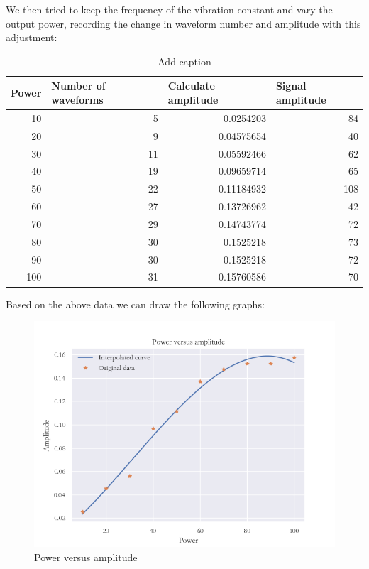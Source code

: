 \documentclass[UTF8]{article}
\begin{document}
    We then tried to keep the frequency of the vibration constant and vary the output power, recording the change in waveform number and amplitude with this adjustment:
    \begin{table}[htbp]
      \centering
      \caption{Add caption}
        \begin{tabular}{rrrr}
        \toprule[2pt]
        \multicolumn{1}{l}{Power} & \multicolumn{1}{l}{Number of waveforms} & \multicolumn{1}{l}{Calculate amplitude} & \multicolumn{1}{l}{Signal amplitude} \\
        \midrule
        10    & 5     & 0.0254203 & 84 \\
        20    & 9     & 0.04575654 & 40 \\
        30    & 11    & 0.05592466 & 62 \\
        40    & 19    & 0.09659714 & 65 \\
        50    & 22    & 0.11184932 & 108 \\
        60    & 27    & 0.13726962 & 42 \\
        70    & 29    & 0.14743774 & 72 \\
        80    & 30    & 0.1525218 & 73 \\
        90    & 30    & 0.1525218 & 72 \\
        100   & 31    & 0.15760586 & 70 \\
        \bottomrule[2pt]
        \end{tabular}%
      \label{tab:addlabel}%
    \end{table}%
    
    Based on the above data we can draw the following graphs:
    \begin{figure}[H]
           	    	\centering
           	    	\includegraphics[clip,scale=1,trim={0 0 0 0}]{fig/fig8.png}
           	        \caption{Power versus amplitude}
           	        \label{figure.8}
    \end{figure}
\end{document}
